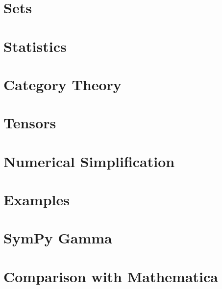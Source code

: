 \documentclass[fleqn,10pt,lineno,numbers]{wlpeerj} %
\begin{document}
\section{Sets}
\label{suppsec:Sets}


\section{Statistics}
\label{suppsec:Stats}


\section{Category Theory}
\label{suppsec:Cat}


\section{Tensors}
\label{suppsec:Ten}


\section{Numerical Simplification}
\label{suppsec:numsimpl}


\section{Examples}
\label{suppsec:examples}


\section{SymPy Gamma}\label{sympy-gamma}



\section{Comparison with Mathematica}
\label{comp-mma}



\end{document}
